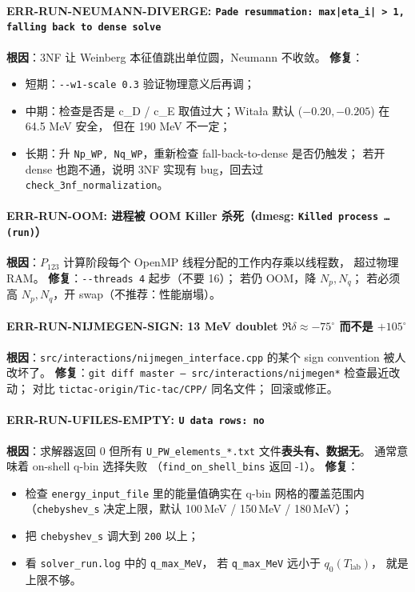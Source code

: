 \paragraph{ERR-RUN-NEUMANN-DIVERGE: \texttt{Pade resummation: max|eta\_i| > 1, falling back to dense solve}}
\textbf{根因}：3NF 让 Weinberg 本征值跳出单位圆，Neumann 不收敛。
\textbf{修复}：
\begin{itemize}
  \item 短期：\texttt{-{}-w1-scale 0.3} 验证物理意义后再调；
  \item 中期：检查是否是 c\_D / c\_E 取值过大；Witała 默认 ($-0.20, -0.205$) 在 64.5 MeV 安全，
        但在 190 MeV 不一定；
  \item 长期：升 \texttt{Np\_WP, Nq\_WP}，重新检查 fall-back-to-dense 是否仍触发；
        若开 dense 也跑不通，说明 3NF 实现有 bug，回去过 \texttt{check\_3nf\_normalization}。
\end{itemize}

\paragraph{ERR-RUN-OOM: 进程被 OOM Killer 杀死（dmesg: \texttt{Killed process \dots (run)}）}
\textbf{根因}：$P_{123}$ 计算阶段每个 OpenMP 线程分配的工作内存乘以线程数，
超过物理 RAM。
\textbf{修复}：\texttt{-{}-threads 4} 起步（不要 16）；
若仍 OOM，降 $N_p, N_q$；
若必须高 $N_p, N_q$，开 swap（不推荐：性能崩塌）。

\paragraph{ERR-RUN-NIJMEGEN-SIGN: 13 MeV doublet $\Re \delta \approx -75^\circ$ 而不是 $+105^\circ$}
\textbf{根因}：\texttt{src/interactions/nijmegen\_interface.cpp} 的某个 sign convention
被人改坏了。
\textbf{修复}：\texttt{git diff master -- src/interactions/nijmegen*}
检查最近改动；
对比 \texttt{tictac-origin/Tic-tac/CPP/} 同名文件；
回滚或修正。

\paragraph{ERR-RUN-UFILES-EMPTY: \texttt{U data rows: no}}
\textbf{根因}：求解器返回 0 但所有 \texttt{U\_PW\_elements\_*.txt} 文件\textbf{表头有、数据无}。
通常意味着 on-shell q-bin 选择失败
（\texttt{find\_on\_shell\_bins} 返回 -1）。
\textbf{修复}：
\begin{itemize}
  \item 检查 \texttt{energy\_input\_file} 里的能量值确实在 q-bin 网格的覆盖范围内
        （\texttt{chebyshev\_s} 决定上限，默认 100\,MeV / 150\,MeV / 180\,MeV）；
  \item 把 \texttt{chebyshev\_s} 调大到 \texttt{200} 以上；
  \item 看 \texttt{solver\_run.log} 中的 \texttt{q\_max\_MeV}，
        若 \texttt{q\_max\_MeV} 远小于 $q_0(T_{\mathrm{lab}})$，
        就是上限不够。
\end{itemize}

